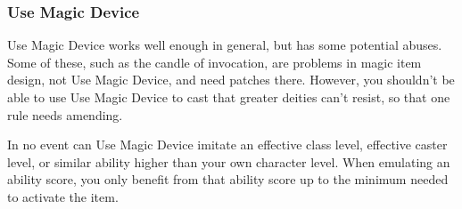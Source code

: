 \subsubsection{Use Magic Device}

Use Magic Device works well enough in general, but has some potential abuses. Some of these, such as the candle of invocation, are problems in magic item design, not Use Magic Device, and need patches there. However, you shouldn't be able to use Use Magic Device to cast  that greater deities can't resist, so that one rule needs amending.

In no event can Use Magic Device imitate an effective class level, effective caster level, or similar ability higher than your own character level. When emulating an ability score, you only benefit from that ability score up to the minimum needed to activate the item.
